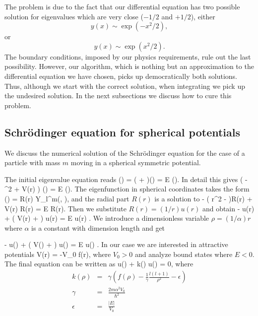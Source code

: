 The problem is due to the fact that our differential equation has 
two possible solution for eigenvalues which are very close ($-1/2$ and $+1/2$), either 
\[
   y(x) \sim \exp{(-x^2/2)},
\]
or 
\[
   y(x) \sim \exp{(x^2/2)}.
\]
The boundary conditions, imposed by our physics requirements, rule out the last 
possibility. However, our algorithm, which is nothing but an approximation
to the differential equation we have chosen, picks up democratically both 
solutions. Thus, although we start with the correct solution, when integrating we pick up
the undesired solution. In the next subsections we discuss how to cure this problem.


\subsection{Schr\"{o}dinger equation for spherical potentials}
%
We discuss the numerical solution of the 
Schr\"{o}dinger equation for the case of a particle with mass $m$
moving in a spherical symmetric potential.

The initial eigenvalue equation reads
%
\be
       \psi() = ( + )\psi()
                       = E \psi().
\label{sch-1}
\ee
%
In detail this gives 
%
\be
\left ( - \nabla^{2} + V(r) \right ) \psi()
                                       = E \psi().
\label{sch-2}
\ee
%
The eigenfunction in spherical coordinates takes the form
%
\be 
       \psi() = R(r) Y_l^m(\theta, \phi),
\label{sch-3}
\ee
%
and the radial part $R(r)$ is a solution to  
%
\be
  - \left (   r^2
   -  \right )R(r) 
     + V(r) R(r) = E R(r).
\label{sch-4}
\ee
%
Then we substitute $R(r) = (1/r) u(r)$ and obtain
%
\be 
  -  u(r) 
       + \left ( V(r) + 
                                    \right ) u(r)  = E u(r) .
\label{sch-5}
\ee
%
We introduce a dimensionless variable $\rho = (1/\alpha) r$
where $\alpha$ is a constant with dimension length and get
% 

\be 
  -  u(\rho) 
       + \left ( V(\rho) + 
          \right ) u(\rho)  = E u(\rho) .
\label{sch-6}
\ee
%
In our case we are interested in attractive potentials
% 
\be 
           V(r) = -V_0 f(r),
\label{sch-7}
\ee
% 
where $V_0 > 0$ and analyze bound states where $ E < 0$.
The final equation can be written as
% 
\be 
{} u(\rho) + k(\rho) u(\rho) = 0,
\label{sch-8}
\ee
% 
where 
% 
\begin{eqnarray} 
k(\rho) &=& \gamma \left ( f(\rho) 
          - \frac{1}{\gamma} \frac{l(l +1)}{\rho^2}
           - \epsilon \right ) \nonumber \\ 
\gamma &=& \frac{2m\alpha^2V_0}{\hbar^2} \nonumber \\ 
\epsilon &=& \frac{|E|}{V_0}
\label{sch-9}
\end{eqnarray}
%



